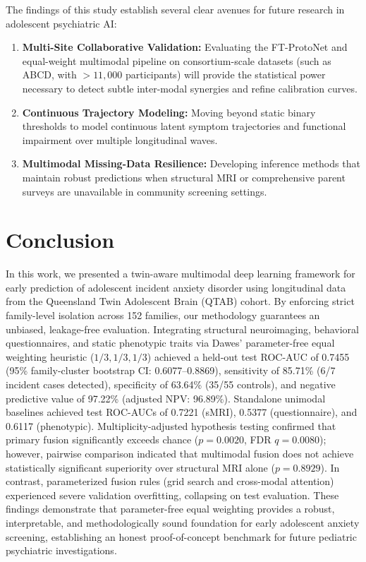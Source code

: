 \documentclass[10pt,letterpaper]{article}
\begin{document}
The findings of this study establish several clear avenues for future research in adolescent psychiatric AI:
\begin{enumerate}
    \item \textbf{Multi-Site Collaborative Validation:} Evaluating the FT-ProtoNet and equal-weight multimodal pipeline on consortium-scale datasets (such as ABCD, with $> 11{,}000$ participants) will provide the statistical power necessary to detect subtle inter-modal synergies and refine calibration curves.
    \item \textbf{Continuous Trajectory Modeling:} Moving beyond static binary thresholds to model continuous latent symptom trajectories and functional impairment over multiple longitudinal waves.
    \item \textbf{Multimodal Missing-Data Resilience:} Developing inference methods that maintain robust predictions when structural MRI or comprehensive parent surveys are unavailable in community screening settings.
\end{enumerate}

\section*{Conclusion}

In this work, we presented a twin-aware multimodal deep learning framework for early prediction of adolescent incident anxiety disorder using longitudinal data from the Queensland Twin Adolescent Brain (QTAB) cohort. By enforcing strict family-level isolation across 152 families, our methodology guarantees an unbiased, leakage-free evaluation. Integrating structural neuroimaging, behavioral questionnaires, and static phenotypic traits via Dawes' parameter-free equal weighting heuristic ($1/3, 1/3, 1/3$) achieved a held-out test ROC-AUC of 0.7455 (95\% family-cluster bootstrap CI: 0.6077--0.8869), sensitivity of 85.71\% (6/7 incident cases detected), specificity of 63.64\% (35/55 controls), and negative predictive value of 97.22\% (adjusted NPV: 96.89\%). Standalone unimodal baselines achieved test ROC-AUCs of 0.7221 (sMRI), 0.5377 (questionnaire), and 0.6117 (phenotypic). Multiplicity-adjusted hypothesis testing confirmed that primary fusion significantly exceeds chance ($p = 0.0020$, FDR $q = 0.0080$); however, pairwise comparison indicated that multimodal fusion does not achieve statistically significant superiority over structural MRI alone ($p = 0.8929$). In contrast, parameterized fusion rules (grid search and cross-modal attention) experienced severe validation overfitting, collapsing on test evaluation. These findings demonstrate that parameter-free equal weighting provides a robust, interpretable, and methodologically sound foundation for early adolescent anxiety screening, establishing an honest proof-of-concept benchmark for future pediatric psychiatric investigations.
\end{document}
